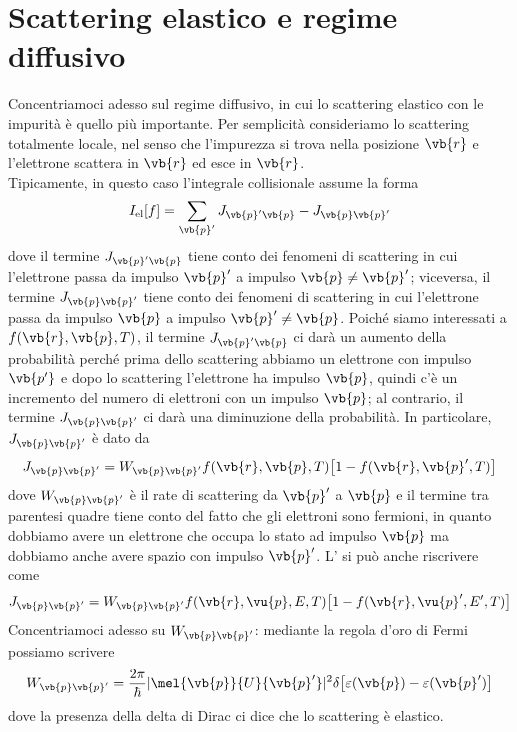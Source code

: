 \section{Scattering elastico e regime diffusivo}
Concentriamoci adesso sul regime diffusivo, in cui lo scattering elastico con le impurità è quello più importante. Per semplicità consideriamo lo scattering totalmente locale, nel senso che l'impurezza si trova nella posizione $\vb{r}$ e l'elettrone scattera in $\vb{r}$ ed esce in $\vb{r}$.\\
Tipicamente, in questo caso l'integrale collisionale assume la forma
\begin{equation*}
    I_{\rm el}[f]
    =\sum_{\vb{p}'} J_{\vb{p}'\vb{p}} - J_{\vb{p}\vb{p}'}
\end{equation*}
dove il termine $J_{\vb{p}'\vb{p}}$ tiene conto dei fenomeni di scattering in cui l'elettrone passa da impulso $\vb{p}'$ a impulso $\vb{p} \neq \vb{p}'$; viceversa, il termine $J_{\vb{p}\vb{p}'}$ tiene conto dei fenomeni di scattering in cui l'elettrone passa da impulso $\vb{p}$ a impulso $\vb{p}' \neq \vb{p}$. Poiché siamo interessati a $f(\vb{r},\vb{p},T)$, il termine $J_{\vb{p}'\vb{p}}$ ci darà un aumento della probabilità perché prima dello scattering abbiamo un elettrone con impulso $\vb{p'}$ e dopo lo scattering l'elettrone ha impulso $\vb{p}$, quindi c'è un incremento del numero di elettroni con un impulso $\vb{p}$; al contrario, il termine $J_{\vb{p}\vb{p}'}$ ci darà una diminuzione della probabilità. In particolare, $J_{\vb{p}\vb{p}'}$ è dato da
\begin{equation}
    J_{\vb{p}\vb{p}'}
    =W_{\vb{p}\vb{p}'} f(\vb{r},\vb{p},T) \bigl[ 1 - f(\vb{r},\vb{p}',T) \bigr]
    \label{eq:J_pp'}
\end{equation}
dove $W_{\vb{p}\vb{p}'}$ è il rate di scattering da $\vb{p}'$ a $\vb{p}$ e il termine tra parentesi quadre tiene conto del fatto che gli elettroni sono fermioni, in quanto dobbiamo avere un elettrone che occupa lo stato ad impulso $\vb{p}$ ma dobbiamo anche avere spazio con impulso $\vb{p}'$.
L' si può anche riscrivere come
\begin{equation*}
    J_{\vb{p}\vb{p}'}
    =W_{\vb{p}\vb{p}'} f(\vb{r},\vu{p},E,T) \bigl[ 1 - f(\vb{r},\vu{p}',E',T) \bigr]
\end{equation*}
Concentriamoci adesso su $W_{\vb{p}\vb{p}'}$: mediante la regola d'oro di Fermi possiamo scrivere
\begin{equation*}
    W_{\vb{p}\vb{p}'}
    =\frac{2\pi}{\hbar} |\mel{\vb{p}}{U}{\vb{p}'}|^2 \delta\bigl[ \varepsilon(\vb{p}) - \varepsilon(\vb{p}') \bigr]
\end{equation*}
dove la presenza della delta di Dirac ci dice che lo scattering è elastico.

